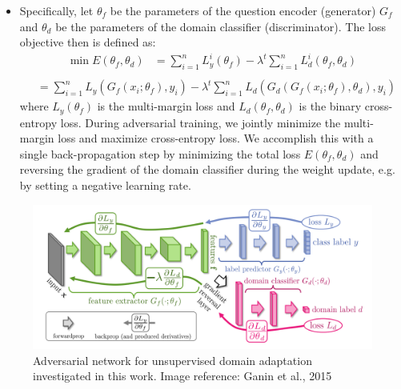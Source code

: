 \documentclass{sigkddExp}
\begin{document}
\begin{itemize}[topsep=0pt,itemsep=-1ex,partopsep=1ex,parsep=1ex]
    \item  Specifically, let $\theta_f$ be the parameters of the question encoder (generator) $G_f$ and $\theta_d$ be the parameters of the domain classifier (discriminator). The loss objective then is defined as:
    \begin{equation}
    \left.\begin{aligned}
     \min E(\theta_f, \theta_d) &= \sum_{i=1}^{n}L_{y}^{i}(\theta_f) - \lambda^{t}\sum_{i=1}^{n}L_{d}^{i}(\theta_f, \theta_d)
     \\
     \end{aligned}\right.
     \end{equation}
    \begin{equation}
    \left.\begin{aligned}
     &= \sum_{i=1}^{n}L_y(G_f(x_i;\theta_f), y_i) 
      - \lambda^{t} \sum_{i=1}^{n}L_d(G_d(G_f(x_i;\theta_f), \theta_d), y_i)
    \end{aligned}\right.
    \end{equation}
    where $L_y(\theta_f)$ is the multi-margin loss and $L_d(\theta_f, \theta_d)$ is the binary cross-entropy loss. During adversarial training, we jointly minimize the multi-margin loss and maximize cross-entropy loss. We accomplish this with a single back-propagation step by minimizing the total loss $E(\theta_f, \theta_d)$ and reversing the gradient of the domain classifier during the weight update, e.g. by setting a negative learning rate.
\end{itemize}


\begin{figure}[h]
\centering
\includegraphics[width=\columnwidth]{img/adversary}
\caption{Adversarial network for unsupervised domain adaptation investigated in this work. Image reference: Ganin et al., 2015 \protect\cite{ganin2015unsupervised}}
\label{fig:adversarial}
\end{figure}
 
\end{document}
